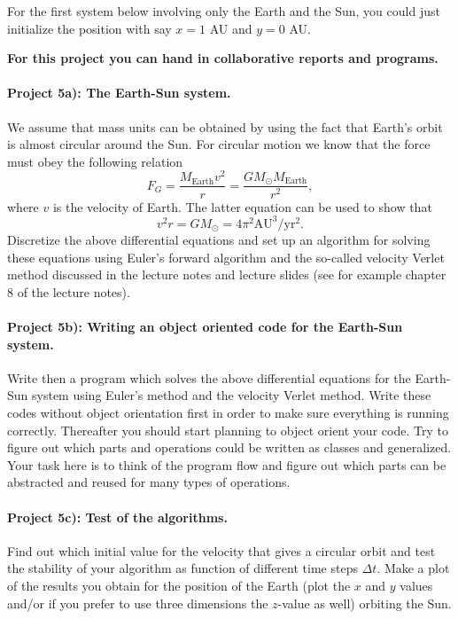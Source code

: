 \documentclass[%
oneside,                 %
final,                   %
10pt]{article}
\begin{document}
For the first system below involving only the Earth and the Sun, you could just initialize the position with say $x=1$ AU
and $y=0$ AU. 

\textbf{For this project you can hand in collaborative reports and programs.}

\paragraph{Project 5a): The Earth-Sun system.}
We assume that mass units can be obtained by using the fact that Earth's orbit is almost circular around the Sun.
For circular motion we know that the force must obey the following relation
\[
F_G= \frac{M_{\mathrm{Earth}}v^2}{r}=\frac{GM_{\odot}M_{\mathrm{Earth}}}{r^2},
\]
where $v$ is the velocity of Earth. 
The latter equation can be used to show that
\[
v^2r=GM_{\odot}=4\pi^2\mathrm{AU}^3/\mathrm{yr}^2.
\]
Discretize the above differential equations and set up an algorithm for solving these equations using Euler's forward algorithm and the so-called velocity Verlet method discussed in the lecture notes and lecture slides (see for example chapter 8 of the lecture notes).

\paragraph{Project 5b): Writing an object oriented code for the Earth-Sun system.}
Write then a program which solves the above differential equations for the Earth-Sun system
using Euler's  method and the velocity Verlet method.  Write these codes without object orientation first in order to make sure everything is running correctly. Thereafter you should start planning to object orient your code.
Try to figure out which parts and operations could be written as classes
and generalized.  
Your task here is to think of the program flow and figure out which parts can be abstracted and reused for many types of operations. 


\paragraph{Project 5c): Test of the algorithms.}
Find out which initial value for the velocity that gives a circular orbit
and test the stability of your algorithm as function of different time steps $\Delta t$. 
Make a plot of the results you obtain for the position of the Earth (plot the $x$ and $y$ values and/or if you prefer to use three dimensions the $z$-value as well) orbiting  the Sun.
\end{document}
